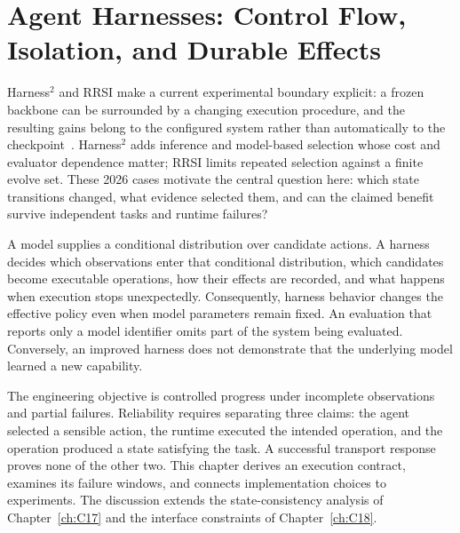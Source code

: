 \chapter{Agent Harnesses: Control Flow, Isolation, and Durable Effects}\label{ch:C20}
Harness$^2$ and RRSI make a current experimental boundary explicit: a frozen backbone can be surrounded by a changing execution procedure, and the resulting gains belong to the configured system rather than automatically to the checkpoint~\cite{corpus261014224,rrsi2026}. Harness$^2$ adds inference and model-based selection whose cost and evaluator dependence matter; RRSI limits repeated selection against a finite evolve set. These 2026 cases motivate the central question here: which state transitions changed, what evidence selected them, and can the claimed benefit survive independent tasks and runtime failures?

A model supplies a conditional distribution over candidate actions. A harness decides which observations enter that conditional distribution, which candidates become executable operations, how their effects are recorded, and what happens when execution stops unexpectedly. Consequently, harness behavior changes the effective policy even when model parameters remain fixed. An evaluation that reports only a model identifier omits part of the system being evaluated. Conversely, an improved harness does not demonstrate that the underlying model learned a new capability.

The engineering objective is controlled progress under incomplete observations and partial failures. Reliability requires separating three claims: the agent selected a sensible action, the runtime executed the intended operation, and the operation produced a state satisfying the task. A successful transport response proves none of the other two. This chapter derives an execution contract, examines its failure windows, and connects implementation choices to experiments. The discussion extends the state-consistency analysis of Chapter~\ref{ch:C17} and the interface constraints of Chapter~\ref{ch:C18}.









